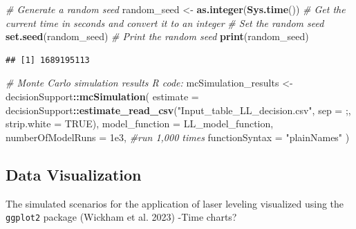 \documentclass[
]{article}
\newenvironment{Shaded}{\begin{snugshade}}{\end{snugshade}}
\newcommand{\AttributeTok}[1]{\textcolor[rgb]{0.13,0.29,0.53}{#1}}
\newcommand{\CommentTok}[1]{\textcolor[rgb]{0.56,0.35,0.01}{\textit{#1}}}
\newcommand{\ConstantTok}[1]{\textcolor[rgb]{0.56,0.35,0.01}{#1}}
\newcommand{\FloatTok}[1]{\textcolor[rgb]{0.00,0.00,0.81}{#1}}
\newcommand{\FunctionTok}[1]{\textcolor[rgb]{0.13,0.29,0.53}{\textbf{#1}}}
\newcommand{\NormalTok}[1]{#1}
\newcommand{\OtherTok}[1]{\textcolor[rgb]{0.56,0.35,0.01}{#1}}
\newcommand{\SpecialCharTok}[1]{\textcolor[rgb]{0.81,0.36,0.00}{\textbf{#1}}}
\newcommand{\StringTok}[1]{\textcolor[rgb]{0.31,0.60,0.02}{#1}}
\begin{document}
\begin{Shaded}
\begin{Highlighting}[]
\CommentTok{\# Generate a random seed}
\NormalTok{random\_seed }\OtherTok{\textless{}{-}} \FunctionTok{as.integer}\NormalTok{(}\FunctionTok{Sys.time}\NormalTok{())  }\CommentTok{\# Get the current time in seconds and convert it to an integer}
\CommentTok{\# Set the random seed}
\FunctionTok{set.seed}\NormalTok{(random\_seed)}
\CommentTok{\# Print the random seed}
\FunctionTok{print}\NormalTok{(random\_seed)}
\end{Highlighting}
\end{Shaded}

\begin{verbatim}
## [1] 1689195113
\end{verbatim}

\begin{Shaded}
\begin{Highlighting}[]
\CommentTok{\# Monte Carlo simulation results R code:}
\NormalTok{mcSimulation\_results }\OtherTok{\textless{}{-}}\NormalTok{ decisionSupport}\SpecialCharTok{::}\FunctionTok{mcSimulation}\NormalTok{(}
  \AttributeTok{estimate =}\NormalTok{ decisionSupport}\SpecialCharTok{::}\FunctionTok{estimate\_read\_csv}\NormalTok{(}\StringTok{"Input\_table\_LL\_decision.csv"}\NormalTok{, }\AttributeTok{sep =} \StringTok{\textquotesingle{};\textquotesingle{}}\NormalTok{, }\AttributeTok{strip.white =} \ConstantTok{TRUE}\NormalTok{),}
  \AttributeTok{model\_function =}\NormalTok{ LL\_model\_function,}
  \AttributeTok{numberOfModelRuns =} \FloatTok{1e3}\NormalTok{, }\CommentTok{\#run 1,000 times}
  \AttributeTok{functionSyntax =} \StringTok{"plainNames"}
\NormalTok{)}
\end{Highlighting}
\end{Shaded}

\hypertarget{data-visualization}{%
\subsection{Data Visualization}\label{data-visualization}}

The simulated scenarios for the application of laser leveling visualized
using the \texttt{ggplot2} package (Wickham et al. 2023) -Time charts?
\end{document}
